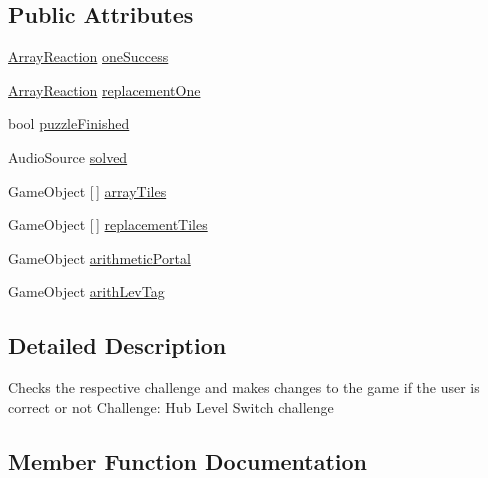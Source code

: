 \subsection*{Public Attributes}
\begin{DoxyCompactItemize}
\item 
\hyperlink{class_array_reaction}{Array\+Reaction} \hyperlink{class_completion_script_three_a1c12a8282a42059d70e6ef786b9def17}{one\+Success}
\item 
\hyperlink{class_array_reaction}{Array\+Reaction} \hyperlink{class_completion_script_three_adc0fcdc0b8a3acf4f200c86e2af1e3c9}{replacement\+One}
\item 
bool \hyperlink{class_completion_script_three_acff2be49aa067d7a15ae9f8754391be3}{puzzle\+Finished}
\item 
Audio\+Source \hyperlink{class_completion_script_three_ac7eba76f069c14642b9fbbf1dbffd81d}{solved}
\item 
Game\+Object \mbox{[}$\,$\mbox{]} \hyperlink{class_completion_script_three_a8d5751f5f7dd7541d6bcd2fd51206f37}{array\+Tiles}
\item 
Game\+Object \mbox{[}$\,$\mbox{]} \hyperlink{class_completion_script_three_a40c51d90e7210b7da4018ac43dc468f7}{replacement\+Tiles}
\item 
Game\+Object \hyperlink{class_completion_script_three_ab5fc9fb13950a145c8c92e9f5b71001f}{arithmetic\+Portal}
\item 
Game\+Object \hyperlink{class_completion_script_three_a37087f61b2e788fa111e68bc14f50e14}{arith\+Lev\+Tag}
\end{DoxyCompactItemize}


\subsection{Detailed Description}
Checks the respective challenge and makes changes to the game if the user is correct or not Challenge\+: Hub Level Switch challenge 

\subsection{Member Function Documentation}
\mbox{\label{class_completion_script_three_a1db60c85017b1469f792649b75e9397b}} 
